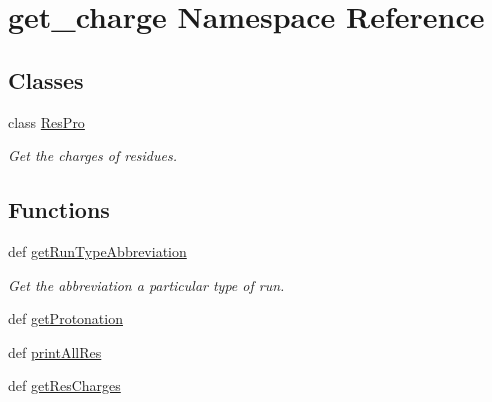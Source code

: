 \hypertarget{namespaceget__charge}{\section{get\-\_\-charge Namespace Reference}
\label{namespaceget__charge}
}
\subsection*{Classes}
\begin{DoxyCompactItemize}
\item 
class \hyperlink{classget__charge_1_1_res_pro}{Res\-Pro}
\begin{DoxyCompactList}\small\item\em Get the charges of residues. \end{DoxyCompactList}\end{DoxyCompactItemize}
\subsection*{Functions}
\begin{DoxyCompactItemize}
\item 
def \hyperlink{namespaceget__charge_a47615becedde34609a22a9a5cbc05b35}{get\-Run\-Type\-Abbreviation}
\begin{DoxyCompactList}\small\item\em Get the abbreviation a particular type of run. \end{DoxyCompactList}\item 
def \hyperlink{namespaceget__charge_a4dbdc4f2c11452b3d60fd495d5abde07}{get\-Protonation}
\item 
def \hyperlink{namespaceget__charge_a0416a83558cc33268da5a9bb382fb020}{print\-All\-Res}
\item 
def \hyperlink{namespaceget__charge_a849fe526c5f836d28b28fbcc5296e527}{get\-Res\-Charges}
\end{DoxyCompactItemize}


